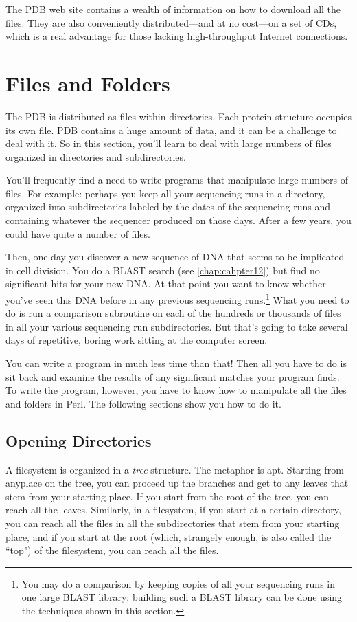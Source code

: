 The PDB web site contains a wealth of information on how to download all the files. They are also conveniently distributed—and at no cost—on a set of CDs, which is a real advantage for those lacking high-throughput Internet connections. 

\section{Files and Folders}
The PDB is distributed as files within directories. Each protein structure occupies its own file. PDB contains a huge amount of data, and it can be a challenge to deal with it. So in this section, you'll learn to deal with large numbers of files organized in directories and subdirectories.

You'll frequently find a need to write programs that manipulate large numbers of files. For example: perhaps you keep all your sequencing runs in a directory, organized into subdirectories labeled by the dates of the sequencing runs and containing whatever the sequencer produced on those days. After a few years, you could have quite a number of files.

Then, one day you discover a new sequence of DNA that seems to be implicated in cell division. You do a BLAST search (see \autoref{chap:cahpter12}) but find no significant hits for your new DNA. At that point you want to know whether you've seen this DNA before in any previous sequencing runs.\footnote{You may do a comparison by keeping copies of all your sequencing runs in one large BLAST library; building such a BLAST library can be done using the techniques shown in this section.} What you need to do is run a comparison subroutine on each of the hundreds or thousands of files in all your various sequencing run subdirectories. But that's going to take several days of repetitive, boring work sitting at the computer screen.

You can write a program in much less time than that! Then all you have to do is sit back and examine the results of any significant matches your program finds. To write the program, however, you have to know how to manipulate all the files and folders in Perl. The following sections show you how to do it. 

\subsection{Opening Directories}
A filesystem is organized in a \textit{tree} structure. The metaphor is apt. Starting from anyplace on the tree, you can proceed up the branches and get to any leaves that stem from your starting place. If you start from the root of the tree, you can reach all the leaves. Similarly, in a filesystem, if you start at a certain directory, you can reach all the files in all the subdirectories that stem from your starting place, and if you start at the root (which, strangely enough, is also called the ``top") of the filesystem, you can reach all the files.

